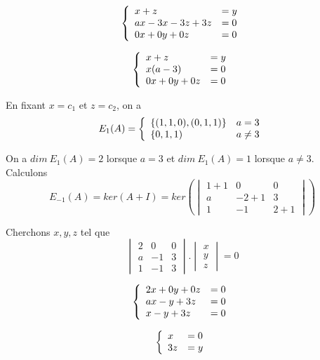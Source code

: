 \documentclass[]{book}
\theoremstyle{definition}
\begin{document}
$$
\left\{ 
\begin{array}{l l}
x  + z & = y\\
ax - 3x -3z + 3z & = 0\\
0x + 0y + 0z & = 0\\
\end{array}
\right. 
$$ 

$$
\left\{ 
\begin{array}{l l}
x  + z & = y\\
x(a - 3) & = 0\\
0x + 0y + 0z & = 0\\
\end{array}
\right. 
$$ 

En fixant $x=c_1$ et $z=c_2$, on a
$$
E_{1}(A)=
\left\{ 
\begin{array}{l l}
\{(1,1,0),(0,1,1)\} & a = 3\\
\{0,1,1) & a \neq 3\\
\end{array}
\right. 
$$ 

On a $dim\ E_{1}(A)= 2$ lorsque $a=3$ et $dim\ E_{1}(A)= 1$ lorsque $a \neq 3$.\\


Calculons 
$$E_{-1}(A)=ker(A+I) = ker\left( \begin{vmatrix} 1 + 1 & 0 & 0 \\ a & -2 + 1 & 3 \\  1 & -1 & 2 + 1 \end{vmatrix} \right)$$

Cherchons $x,y,z$ tel que
$$\begin{vmatrix} 2 & 0 & 0 \\ a & -1 & 3 \\  1 & -1 & 3 \end{vmatrix} . \begin{vmatrix} x \\ y \\  z \end{vmatrix} = 0$$

$$
\left\{ 
\begin{array}{l l}
2x + 0y + 0z & = 0\\
ax - y + 3z & = 0\\
x - y + 3z & = 0\\
\end{array}
\right. 
$$ 

$$
\left\{ 
\begin{array}{l l}
x  & = 0\\
3z & = y\\
\end{array}
\right. 
$$ 
\end{document}
